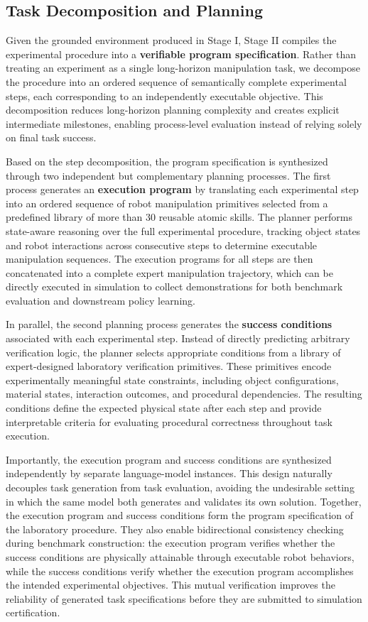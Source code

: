 \documentclass[sigconf]{acmart}
\begin{document}
\subsection{Task Decomposition and Planning}
\label{sec:task-decomposition}

Given the grounded environment produced in Stage I, Stage II compiles the experimental procedure into a \textbf{verifiable program specification}. Rather than treating an experiment as a single long-horizon manipulation task, we decompose the procedure into an ordered sequence of semantically complete experimental steps, each corresponding to an independently executable objective. This decomposition reduces long-horizon planning complexity and creates explicit intermediate milestones, enabling process-level evaluation instead of relying solely on final task success.

Based on the step decomposition, the program specification is synthesized through two independent but complementary planning processes. The first process generates an \textbf{execution program} by translating each experimental step into an ordered sequence of robot manipulation primitives selected from a predefined library of more than 30 reusable atomic skills. The planner performs state-aware reasoning over the full experimental procedure, tracking object states and robot interactions across consecutive steps to determine executable manipulation sequences. The execution programs for all steps are then concatenated into a complete expert manipulation trajectory, which can be directly executed in simulation to collect demonstrations for both benchmark evaluation and downstream policy learning.

In parallel, the second planning process generates the \textbf{success conditions} associated with each experimental step. Instead of directly predicting arbitrary verification logic, the planner selects appropriate conditions from a library of expert-designed laboratory verification primitives. These primitives encode experimentally meaningful state constraints, including object configurations, material states, interaction outcomes, and procedural dependencies. The resulting conditions define the expected physical state after each step and provide interpretable criteria for evaluating procedural correctness throughout task execution.

Importantly, the execution program and success conditions are synthesized independently by separate language-model instances. This design naturally decouples task generation from task evaluation, avoiding the undesirable setting in which the same model both generates and validates its own solution. Together, the execution program and success conditions form the program specification of the laboratory procedure. They also enable bidirectional consistency checking during benchmark construction: the execution program verifies whether the success conditions are physically attainable through executable robot behaviors, while the success conditions verify whether the execution program accomplishes the intended experimental objectives. This mutual verification improves the reliability of generated task specifications before they are submitted to simulation certification.
\end{document}
